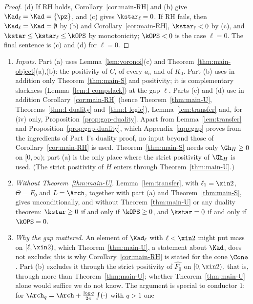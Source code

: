 \begin{proof}
(d) If RH holds, Corollary~\ref{cor:main-RH} and (b) give $\Kad_\ell=\Kad=\{\pz\}$, and (c) gives $\kstar_\ell=0$. If RH fails, then
$\Kad_\ell=\Kad=\emptyset$ by (b) and Corollary~\ref{cor:main-RH}, $\kstar_\ell<0$ by (c), and $\kstar\le\kstar_\ell\le\kOPS$ by monotonicity; $\kOPS<0$
is the case $\ell=0$. The final sentence is (c) and (d) for $\ell=0$.
\end{proof}

\begin{remark}\label{rem:nogap}
\begin{enumerate}[label=(\arabic*),leftmargin=*]
\item \emph{Inputs.} Part (a) uses Lemma~\ref{lem:voronoi}(c) and Theorem~\ref{thm:main-object}(a),(b): the positivity of $C$, of every $a_n$
and of $K_0$. Part (b) uses in addition only Theorem~\ref{thm:main-S} and positivity; it is complementary slackness
(Lemma~\ref{lem:I-compslack}) at the gap $\ell$. Parts (c) and (d) use in addition Corollary~\ref{cor:main-RH} (hence Theorem~\ref{thm:main-U},
Theorems~\ref{thm:I-duality} and~\ref{thm:I-logic}), Lemma~\ref{lem:transfer} and, for (iv) only, Proposition~\ref{prop:gap-duality}. Apart
from Lemma~\ref{lem:transfer} and Proposition~\ref{prop:gap-duality}, which Appendix~\ref{app:gap} proves from the ingredients of Part~I's duality
proof, no input beyond those of Corollary~\ref{cor:main-RH} is used. Theorem~\ref{thm:main-S} needs only $\Gh_H\ge0$ on $[0,\infty)$; part (a) is
the only place where the strict positivity of $\Gh_H$ is used. (The strict positivity of $H$ enters through Theorem~\ref{thm:main-U}.)
\item \emph{Without Theorem~\ref{thm:main-U}.} Lemma~\ref{lem:transfer}, with $\ell_1=\xin2$, $\Theta=F_0$ and $L=\Arch$, together with part (a)
and Theorem~\ref{thm:main-S}, gives unconditionally, and without Theorem~\ref{thm:main-U} or any duality theorem: $\kstar\ge0$ if and only if
$\kOPS\ge0$, and $\kstar=0$ if and only if $\kOPS=0$.
\item \emph{Why the gap mattered.} An element of $\Kad_\ell$ with $\ell<\xin2$ might put mass on $[\ell,\xin2)$, which Theorem~\ref{thm:main-U}, a statement
about $\Kad$, does not exclude; this is why Corollary~\ref{cor:main-RH} is stated for the cone $\Cone$. Part (b) excludes it through the strict
positivity of $\widehat{F_0}$ on $[0,\xin2)$, that is, through more than Theorem~\ref{thm:main-U}; whether Theorem~\ref{thm:main-U}
alone would suffice we do not know. The argument is special to conductor $1$: for $\Arch_q=\Arch+\frac{\log q}{2\pi}\int(\cdot)$ with $q>1$ one

\end{enumerate}
\end{remark}
